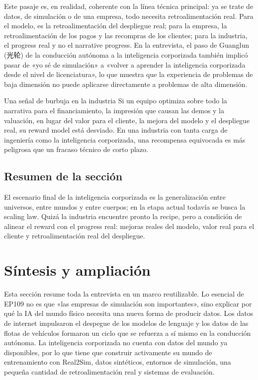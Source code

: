 \documentclass[a4paper]{article}
\begin{document}
Este pasaje es, en realidad, coherente con la línea técnica principal: ya se trate de datos, de simulación o de una empresa, todo necesita retroalimentación real. Para el modelo, es la retroalimentación del despliegue real; para la empresa, la retroalimentación de los pagos y las recompras de los clientes; para la industria, el progress real y no el narrative progress. En la entrevista, el paso de Guanglun (光轮) de la conducción autónoma a la inteligencia corporizada también implicó pasar de «yo sé de simulación» a «volver a aprender la inteligencia corporizada desde el nivel de licenciatura», lo que muestra que la experiencia de problemas de baja dimensión no puede aplicarse directamente a problemas de alta dimensión.

\begin{warningbox}{Una señal de burbuja en la industria}
Si un equipo optimiza sobre todo la narrativa para el financiamiento, la impresión que causan las demos y la valuación, en lugar del valor para el cliente, la mejora del modelo y el despliegue real, su reward model está desviado. En una industria con tanta carga de ingeniería como la inteligencia corporizada, una recompensa equivocada es más peligrosa que un fracaso técnico de corto plazo.
\end{warningbox}

\subsection{Resumen de la sección}

El escenario final de la inteligencia corporizada es la generalización entre universos, entre mundos y entre cuerpos; en la etapa actual todavía se busca la scaling law. Quizá la industria encuentre pronto la recipe, pero a condición de alinear el reward con el progress real: mejoras reales del modelo, valor real para el cliente y retroalimentación real del despliegue.
\section{Síntesis y ampliación}

Esta sección resume toda la entrevista en un marco reutilizable. Lo esencial de EP109 no es que «las empresas de simulación son importantes», sino explicar por qué la IA del mundo físico necesita una nueva forma de producir datos. Los datos de internet impulsaron el despegue de los modelos de lenguaje y los datos de las flotas de vehículos formaron un ciclo que se refuerza a sí mismo en la conducción autónoma. La inteligencia corporizada no cuenta con datos del mundo ya disponibles, por lo que tiene que construir activamente su mundo de entrenamiento con Real2Sim, datos sintéticos, entornos de simulación, una pequeña cantidad de retroalimentación real y sistemas de evaluación.
\end{document}
